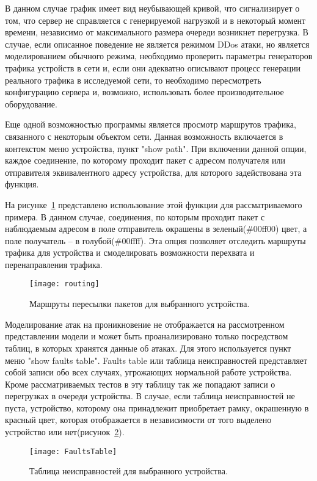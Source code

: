     В данном случае график имеет вид неубывающей кривой, что сигнализирует о том, что сервер не справляется с генерируемой нагрузкой и в некоторый момент времени, независимо от максимального размера очереди возникнет перегрузка. В случае, если описанное поведение не является режимом DDos атаки, но является моделированием обычного режима, необходимо проверить параметры генераторов трафика устройств в сети и, если они адекватно описывают процесс генерации реального трафика в исследуемой сети, то необходимо пересмотреть конфигурацию сервера и, возможно, использовать более производительное оборудование.

    Еще одной возможностью программы является просмотр маршрутов трафика, связанного с некоторым объектом сети. Данная возможность включается в контекстом меню устройства, пункт "show path". При включении данной опции, каждое соединение, по которому проходит пакет с адресом получателя или отправителя эквивалентного адресу устройства, для которого задействована эта функция.

    На рисунке~\ref{Pic14} представлено использование этой функции для рассматриваемого примера. В данном случае, соединения, по которым проходит пакет с наблюдаемым адресом в поле отправитель окрашены в зеленый(\#00ff00) цвет, а поле получатель -- в голубой(\#00ffff). Эта опция позволяет отследить маршруты трафика для устройства и смоделировать возможности перехвата и перенаправления трафика.


    \begin{figure}[h!]\center
        \texttt{[image: routing]}
        \caption{Маршруты пересылки пакетов для выбранного устройства. } \label{Pic14}
    \end{figure}

    Моделирование атак на проникновение не отображается на рассмотренном представлении модели и может быть проанализировано только посредством таблиц, в которых хранятся данные об атаках. Для этого используется пункт меню "show faults table". Faults table или таблица неисправностей представляет собой записи обо всех случаях, угрожающих нормальной работе устройства. Кроме рассматриваемых тестов в эту таблицу так же попадают записи о перегрузках в очереди устройства. В случае, если таблица неисправностей не пуста, устройство, которому она принадлежит приобретает рамку, окрашенную в красный цвет, которая отображается в независимости от того выделено устройство или нет(рисунок~\ref{Pic15}).


    \begin{figure}[h!]\center
        \texttt{[image: FaultsTable]}
        \caption{Таблица неисправностей для выбранного устройства. } \label{Pic15}
    \end{figure}

